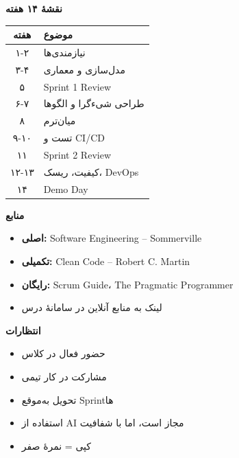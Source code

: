 \documentclass[14pt, a4paper, landscape]{extarticle}
\newcommand{\slide}[1]{%
    \newpage
    \begin{center}
    \begin{minipage}[t]{0.95\textwidth}
    \vspace{0.5cm}
    #1
    \vspace{0.5cm}
    \end{minipage}
    \end{center}
}
\newcommand{\slidetitle}[1]{%
    \begin{center}
        {\LARGE\bfseries\textcolor{primary}{#1}}
    \end{center}
    \vspace{0.5cm}
}
\begin{document}
\slide{
    \slidetitle{نقشهٔ ۱۴ هفته}
    \vspace{0.3cm}
    \begin{center}
        \begin{tabular}{cl}
            \toprule
            \textbf{هفته} & \textbf{موضوع} \\
            \midrule
            ۱-۲ & نیازمندی‌ها \\
            \hline
            ۳-۴ & مدل‌سازی و معماری \\
            \hline
            ۵ & Sprint 1 Review \\
            \hline
            ۶-۷ & طراحی شیءگرا و الگوها \\
            \hline
            ۸ & میان‌ترم \\
            \hline
            ۹-۱۰ & تست و CI/CD \\
            \hline
            ۱۱ & Sprint 2 Review \\
            \hline
            ۱۲-۱۳ & کیفیت، ریسک، DevOps \\
            \hline
            ۱۴ & Demo Day \\
            \bottomrule
        \end{tabular}
    \end{center}
}

\slide{
    \slidetitle{منابع}
    \vspace{0.5cm}
    \begin{itemize}[itemsep=0.6em]
        \item \textbf{اصلی:} Software Engineering – Sommerville
        \item \textbf{تکمیلی:} Clean Code – Robert C. Martin
        \item \textbf{رایگان:} Scrum Guide، The Pragmatic Programmer
        \item لینک به منابع آنلاین در سامانهٔ درس
    \end{itemize}
}

\slide{
    \slidetitle{انتظارات}
    \vspace{0.5cm}
    \begin{itemize}[itemsep=0.6em]
        \item حضور فعال در کلاس
        \item مشارکت در کار تیمی
        \item تحویل به‌موقع Sprintها
        \item استفاده از AI مجاز است، اما با شفافیت
        \item کپی = نمرهٔ صفر
    \end{itemize}
}
\end{document}
